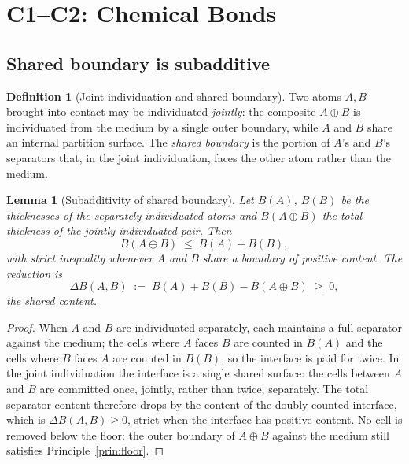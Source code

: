 \documentclass[11pt,twocolumn,a4paper]{article}
\theoremstyle{thmstyle}
\newtheorem{lemma}[theorem]{Lemma}
\theoremstyle{definition}
\newtheorem{definition}[theorem]{Definition}
\theoremstyle{remark}
\newcommand{\thick}{B}                 %
\begin{document}
\section{C1--C2: Chemical Bonds}
\label{sec:bond}

\subsection{Shared boundary is subadditive}

\begin{definition}[Joint individuation and shared boundary]
\label{def:joint}
Two atoms $A,B$ brought into contact may be individuated \emph{jointly}:
the composite $A\!\oplus\!B$ is individuated from the medium by a single
outer boundary, while $A$ and $B$ share an internal partition surface.
The \emph{shared boundary} is the portion of $A$'s and $B$'s separators
that, in the joint individuation, faces the other atom rather than the
medium.
\end{definition}

\begin{lemma}[Subadditivity of shared boundary]
\label{lem:subadditive}
Let $\thick(A)$, $\thick(B)$ be the thicknesses of the separately
individuated atoms and $\thick(A\!\oplus\!B)$ the total thickness of the
jointly individuated pair. Then
\[
\thick(A\!\oplus\!B)\;\le\;\thick(A)+\thick(B),
\]
with strict inequality whenever $A$ and $B$ share a boundary of positive
content. The reduction is
\[
\Delta\thick(A,B)\;:=\;\thick(A)+\thick(B)-\thick(A\!\oplus\!B)\;\ge\;0,
\]
the \emph{shared content}.
\end{lemma}

\begin{proof}
When $A$ and $B$ are individuated separately, each maintains a full
separator against the medium; the cells where $A$ faces $B$ are counted in
$\thick(A)$ and the cells where $B$ faces $A$ are counted in $\thick(B)$,
so the interface is paid for twice. In the joint individuation the
interface is a single shared surface: the cells between $A$ and $B$ are
committed once, jointly, rather than twice, separately. The total
separator content therefore drops by the content of the doubly-counted
interface, which is $\Delta\thick(A,B)\ge0$, strict when the interface
has positive content. No cell is removed below the floor: the outer
boundary of $A\!\oplus\!B$ against the medium still satisfies
Principle~\ref{prin:floor}.
\end{proof}
\end{document}
